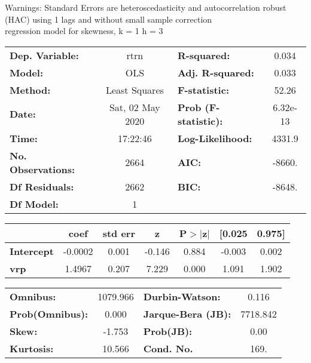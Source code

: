 Warnings: \newline
 [1] Standard Errors are heteroscedasticity and autocorrelation robust (HAC) using 1 lags and without small sample correction\\ 

regression model for skewness, k = 1 h = 3\begin{center}
\begin{tabular}{lclc}
\toprule
\textbf{Dep. Variable:}    &       rtrn       & \textbf{  R-squared:         } &     0.034   \\
\textbf{Model:}            &       OLS        & \textbf{  Adj. R-squared:    } &     0.033   \\
\textbf{Method:}           &  Least Squares   & \textbf{  F-statistic:       } &     52.26   \\
\textbf{Date:}             & Sat, 02 May 2020 & \textbf{  Prob (F-statistic):} &  6.32e-13   \\
\textbf{Time:}             &     17:22:46     & \textbf{  Log-Likelihood:    } &    4331.9   \\
\textbf{No. Observations:} &        2664      & \textbf{  AIC:               } &    -8660.   \\
\textbf{Df Residuals:}     &        2662      & \textbf{  BIC:               } &    -8648.   \\
\textbf{Df Model:}         &           1      & \textbf{                     } &             \\
\bottomrule
\end{tabular}
\begin{tabular}{lcccccc}
                   & \textbf{coef} & \textbf{std err} & \textbf{z} & \textbf{P$> |$z$|$} & \textbf{[0.025} & \textbf{0.975]}  \\
\midrule
\textbf{Intercept} &      -0.0002  &        0.001     &    -0.146  &         0.884        &       -0.003    &        0.002     \\
\textbf{vrp}       &       1.4967  &        0.207     &     7.229  &         0.000        &        1.091    &        1.902     \\
\bottomrule
\end{tabular}
\begin{tabular}{lclc}
\textbf{Omnibus:}       & 1079.966 & \textbf{  Durbin-Watson:     } &    0.116  \\
\textbf{Prob(Omnibus):} &   0.000  & \textbf{  Jarque-Bera (JB):  } & 7718.842  \\
\textbf{Skew:}          &  -1.753  & \textbf{  Prob(JB):          } &     0.00  \\
\textbf{Kurtosis:}      &  10.566  & \textbf{  Cond. No.          } &     169.  \\
\bottomrule
\end{tabular}
\end{center}

